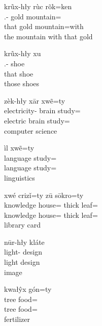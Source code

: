 \begin{exe}
    \ex
    \glll
    krũx-hły rùc rõk=ken \\
    \Dem{}.\Dist{}-\Adj{} gold mountain=\Com{} \\
    that gold mountain=with \\
    \glt
    the mountain with that gold
\end{exe}

\begin{exe}
    \ex
    \glll
    krũx-hły xu \\
    \Dem{}.\Dist{}-\Adj{} shoe \\
    that shoe \\
    \glt
    those shoes
\end{exe}

\begin{exe}
    \ex
    \glll
    zèk-hły xār xwẽ=ty \\
    electricity-\Adj{} brain study=\Poss{} \\
    electric brain study=\Poss{} \\
    \glt
    computer science
\end{exe}

\begin{exe}
    \ex
    \glll
    ìl xwẽ=ty \\
    language study=\Poss{} \\
    language study=\Poss{} \\
    \glt
    linguistics
\end{exe}

\begin{exe}
    \ex
    \glll
    xwé crizǐ=ty zū sōkro=ty \\
    knowledge house=\Poss{} thick leaf=\Poss{} \\
    knowledge house=\Poss{} thick leaf=\Poss{} \\
    \glt
    library card
\end{exe}

\begin{exe}
    \ex
    \glll
    nūr-hły kláte \\
    light-\Adj{} design \\
    light design \\
    \glt
    [digital] image
\end{exe}

\begin{exe}
    \ex
    \glll
    kwałŷx gón=ty  \\
    tree food=\Poss{} \\
    tree food=\Poss{} \\
    \glt
    fertilizer
\end{exe}

